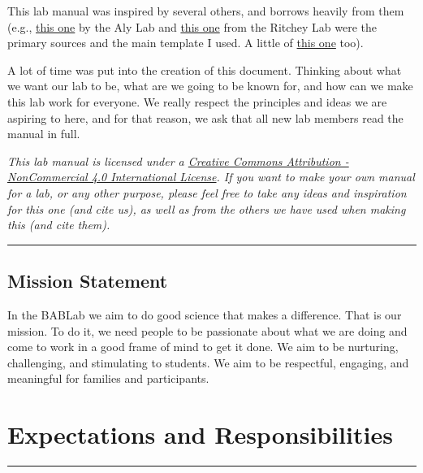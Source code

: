 \documentclass[]{book}
\begin{document}
This lab manual was inspired by several others, and borrows heavily from them (e.g., \href{https://github.com/alylab/labmanual/blob/master/aly-lab-manual.pdf}{this one} by the Aly Lab and \href{https://github.com/memobc/memolab-manual}{this one} from the Ritchey Lab were the primary sources and the main template I used. A little of \href{https://github.com/jpeelle/peellelab_manual/blob/master/peellelab_manual.pdf}{this one} too).

A lot of time was put into the creation of this document. Thinking about what we want our lab to be, what are we going to be known for, and how can we make this lab work for everyone. We really respect the principles and ideas we are aspiring to here, and for that reason, we ask that all new lab members read the manual in full.

\emph{This lab manual is licensed under a \href{https://creativecommons.org/licenses/by-nc/4.0/}{Creative Commons Attribution - NonCommercial 4.0 International License}. If you want to make your own manual for a lab, or any other purpose, please feel free to take any ideas and inspiration for this one (and cite us), as well as from the others we have used when making this (and cite them).}

\begin{center}\rule{0.5\linewidth}{0.5pt}\end{center}

\hypertarget{mission-statement}{%
\section{Mission Statement}\label{mission-statement}}

In the BABLab we aim to do good science that makes a difference. That is our mission. To do it, we need people to be passionate about what we are doing and come to work in a good frame of mind to get it done. We aim to be nurturing, challenging, and stimulating to students. We aim to be respectful, engaging, and meaningful for families and participants.

\hypertarget{expectations-and-responsibilities}{%
\chapter{Expectations and Responsibilities}\label{expectations-and-responsibilities}}

\begin{center}\rule{0.5\linewidth}{0.5pt}\end{center}
\end{document}
